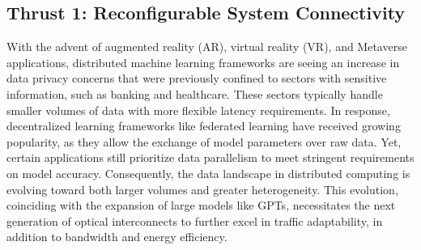 \subsection{Thrust 1: Reconfigurable System Connectivity}

With the advent of augmented reality (AR), virtual reality (VR), and Metaverse applications, distributed machine learning frameworks are seeing an increase in data privacy concerns that were previously confined to sectors with sensitive information, such as banking and healthcare. These sectors typically handle smaller volumes of data with more flexible latency requirements. In response, decentralized learning frameworks like federated learning have received growing popularity, as they allow the exchange of model parameters over raw data. Yet, certain applications still prioritize data parallelism to meet stringent requirements on model accuracy. Consequently, the data landscape in distributed computing is evolving toward both larger volumes and greater heterogeneity. This evolution, coinciding with the expansion of large models like GPTs, necessitates the next generation of optical interconnects to further excel in traffic adaptability, in addition to bandwidth and energy efficiency.

